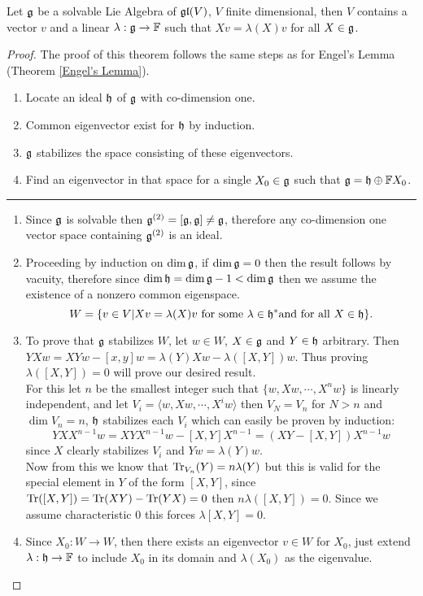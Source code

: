 \begin{teo}
	Let $\mathfrak{g}$ be a solvable Lie Algebra of $\mathfrak{gl}(V)$, $V$ finite dimensional, then $V$ contains a vector $v$ and a linear $\lambda:\mathfrak{g} \rightarrow \mathbb{F}$ such that $Xv = \lambda(X)v$ for all $X \in \mathfrak{g}$.
	\label{Lie's Theorem}
\end{teo}
\begin{proof}
	The proof of this theorem follows the same steps as for Engel's Lemma (Theorem \ref{Engel's Lemma}).
	\begin{enumerate}
		\item Locate an ideal $\mathfrak{h}$ of $\mathfrak{g}$ with co-dimension one.
		\item Common eigenvector exist for $\mathfrak{h}$ by induction.
		\item $\mathfrak{g}$ stabilizes the space consisting of these eigenvectors.
		\item Find an eigenvector in that space for a single $X_0 \in \mathfrak{g}$ such that $\mathfrak{g} = \mathfrak{h} \oplus \mathbb{F} X_0$.
	\end{enumerate}
	\noindent\rule{16cm}{0.4pt}
	\begin{enumerate}
		\item Since $\mathfrak{g}$ is solvable then $\mathfrak{g}^{(2)}=[\mathfrak{g},\mathfrak{g}]\not=\mathfrak{g}$, therefore any co-dimension one vector space  containing $\mathfrak{g}^{(2)}$ is an ideal.\\
		\item Proceeding by induction on $\dim \mathfrak{g}$, if $\dim \mathfrak{g}=0$ then the result follows by vacuity, therefore since $\dim \mathfrak{h} = \dim \mathfrak{g} - 1 < \dim \mathfrak{g}$ then we assume the existence of a nonzero common eigenspace. $$W = \{v \in V | Xv = \lambda(X)v \text{ for some } \lambda \in \mathfrak{h}^* \text{and for all }X \in \mathfrak{h}\}.$$
		\item To prove that $\mathfrak{g}$ stabilizes $W$, let $w \in W$, $X \in \mathfrak{g}$ and $Y \in \mathfrak{h}$ arbitrary. Then $YXw = XYw - [x,y]w = \lambda(Y)Xw - \lambda([X,Y])w$. Thus proving $\lambda([X,Y])=0$ will prove our desired result.\\
		For this let $n$ be the smallest integer such that $\{w,Xw,\cdots,X^nw\}$ is linearly independent, and let $V_i = \langle w, Xw , \cdots, X^i w\rangle$ then $V_{N} = V_n$ for $N>n$ and $\dim V_n = n$, $\mathfrak{h}$ stabilizes each $V_i$ which can easily be proven by induction:
		$$YXX^{n-1}w = XYX^{n-1}w - [X,Y]X^{n-1} = (XY - [X,Y])X^{n-1}w$$ since $X$ clearly stabilizes $V_i$ and $Yw = \lambda(Y)w$.\\
		Now from this we know that $\text{Tr}_{V_n}(Y)=n\lambda(Y)$ but this is valid for the special element in $Y$ of the form $[X,Y]$, since $\text{Tr}([X,Y])= \text{Tr}(XY)-\text{Tr}(YX)=0$ then $n\lambda([X,Y])=0$. Since we assume characteristic $0$ this forces $\lambda[X,Y]=0$.
		\item Since $X_0: W \rightarrow W$, then there exists an eigenvector $v \in W$ for $X_0$, just extend $\lambda: \mathfrak{h} \rightarrow \mathbb{F}$ to include $X_0$ in its domain and $\lambda(X_0)$ as the eigenvalue.
		\end{enumerate}
\end{proof}
